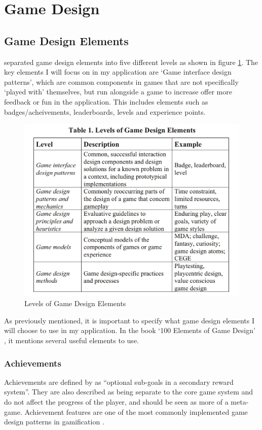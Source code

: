 \section{Game Design}
\subsection{Game Design Elements}
\cite{Deterding:2011:GDE:2181037.2181040} separated game design elements into five different levels as shown in figure \ref{fig:GameDesignElements}. 
The key elements I will focus on in my application are `Game interface design patterns', which are common components in games that are not specifically `played with' themselves, but run alongside a game to increase offer more feedback or fun in the application.
This includes elements such as badges/acheivements, leaderboards, levels and experience points.

\begin{figure}[ht]
	\centering
	\includegraphics[scale=0.45]{images/DeterdingsLevelsOfGameDesignElements.jpg}
	\caption{Levels of Game Design Elements}
	\label{fig:GameDesignElements}
\end{figure}

As previously mentioned, it is important to specify what game design elements I will choose to use in my application.
In the book `100 Elements of Game Design' \citep{despain2012100}, it mentions several useful elements to use.

\subsubsection{Achievements}
Achievements are defined by \cite{Montola:2009:AGA:1621841.1621859} as ``optional sub-goals in a secondary reward system''. 
They are also described as being separate to the core game system and do not affect the progress of the player, and should be seen as more of a meta-game. Achievement features are one of the most commonly implemented game design patterns in gamification \citep{hamari2011framework}.

